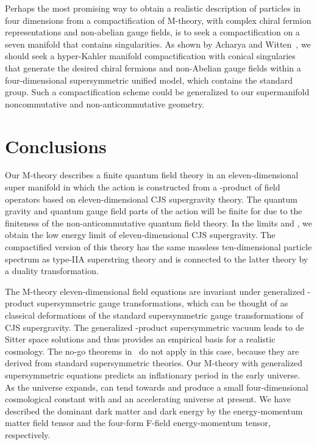 \documentclass[a4paper,12pt]{article}
\begin{document}
Perhaps the most promising way to obtain a realistic description of particles in
four dimensions from a compactification of M-theory, with complex chiral
fermion representations and non-abelian gauge fields, is to seek
a compactification on a seven manifold that contains singularities. As shown by
Acharya and Witten~\cite{Acharya}, we should seek a hyper-Kahler manifold
compactification with conical singularies that generate the desired chiral fermions
and non-Abelian gauge fields within a four-dimensional supersymmetric unified model,
which contains the standard \coordHE{} group.  Such
a compactification scheme could be generalized to our supermanifold noncommutative
and non-anticommutative geometry.

\section{Conclusions}

Our M-theory describes a finite quantum field theory in an
eleven-dimensional super manifold in which the action is constructed from a
\myHighlight{$\diamondsuit$}\coordHE{}-product of field operators based on eleven-dimensional CJS
supergravity theory. The quantum gravity and quantum gauge field parts of
the action will be finite for \myHighlight{$\Lambda < \infty$}\coordHE{} due to the finiteness of
the non-anticommutative quantum field theory. In the limits
\coordHE{} and \coordHE{}, we obtain the low energy limit of eleven-dimensional CJS supergravity. The
compactified version of this theory has the same massless ten-dimensional particle
spectrum as type-IIA superstring theory and is connected to the latter theory by a
duality transformation.

The M-theory eleven-dimensional field equations are invariant under
generalized \myHighlight{$\diamondsuit$}\coordHE{}-product supersymmetric gauge transformations,
which can be thought of as classical deformations of the standard
supersymmetric gauge transformations of CJS supergravity. The generalized
\myHighlight{$\diamondsuit$}\coordHE{}-product supersymmetric vacuum leads to de Sitter
space solutions and thus provides an empirical basis for a
realistic cosmology. The no-go theorems
in~\cite{Gibbons,Maldacena} do not apply in this case, because
they are derived from standard supersymmetric theories. Our
M-theory with generalized supersymmetric equations predicts an
inflationary period in the early universe. As the universe
expands, \coordHE{} can tend towards \coordHE{} and
produce a small four-dimensional cosmological constant with
\coordHE{} and an accelerating universe at present. We have
described the dominant dark matter and dark energy by the
energy-momentum matter field tensor and the
four-form F-field energy-momentum tensor, respectively.
\end{document}
